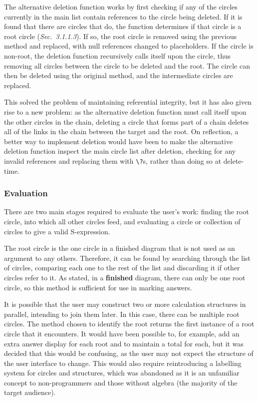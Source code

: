 \documentclass[12pt,twoside,notitlepage,xetex]{report}
\begin{document}
{The alternative deletion function works by first checking if any of the circles currently in the main list contain references to the circle being deleted.  If it is found that there are circles that do, the function determines if that circle is a root circle (\emph{Sec.~3.1.1.3}).  If so, the root circle is removed using the previous method and replaced, with null references changed to placeholders.  If the circle is non-root, the deletion function recursively calls itself upon the circle, thus removing all circles between the circle to be deleted and the root.  The circle can then be deleted using the original method, and the intermediate circles are replaced.

This solved the problem of maintaining referential integrity, but it has also given rise to a new problem: as the alternative deletion function must call itself upon the other circles in the chain, deleting a circle that forms part of a chain deletes all of the links in the chain between the target and the root.  On reflection, a better way to implement deletion would have been to make the alternative deletion function inspect the main circle list after deletion, checking for any invalid references and replacing them with \verb¬\?¬s, rather than doing so at delete-time.

\subsubsection{Evaluation}

There are two main stages required to evaluate the user's work: finding the root circle, into which all other circles feed, and evaluating a circle or collection of circles to give a valid S-expression.

The root circle is the one circle in a finished diagram that is not used as an argument to any others.  Therefore, it can be found by searching through the list of circles, comparing each one to the rest of the list and discarding it if other circles refer to it.  As stated, in a {\bf finished} diagram, there can only be one root circle, so this method is sufficient for use in marking answers.

It is possible that the user may construct two or more calculation structures in parallel, intending to join them later.  In this case, there can be multiple root circles.  The method chosen to identify the root returns the first instance of a root circle that it encounters.  It would have been possible to, for example, add an extra answer display for each root and to maintain a total for each, but it was decided that this would be confusing, as the user may not expect the structure of the user interface to change.  This would also require reintroducing a labelling system for circles and structures, which was abandoned as it is an unfamiliar concept to non-programmers and those without algebra (the majority of the target audience).

}
\end{document}
